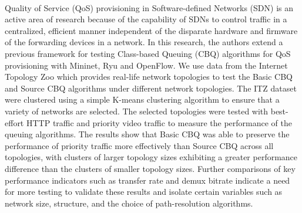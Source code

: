 \begin{thesisabstract}
\paragraph{         } Quality of Service (QoS) provisioning in Software-defined Networks (SDN) is an active area of research because of the capability of SDNs to control traffic in a centralized, efficient manner independent of the disparate hardware and firmware of the forwarding devices in a network. In this research, the authors extend a previous framework for testing Class-based Queuing (CBQ) algorithms for QoS provisioning with Mininet, Ryu and OpenFlow. We use data from the Internet Topology Zoo which provides real-life network topologies to test the Basic CBQ and Source CBQ algorithms under different network topologies. The ITZ dataset were clustered using a simple K-means clustering algorithm to ensure that a variety of networks are selected. The selected topologies were tested with best-effort HTTP traffic and priority video traffic to measure the performance of the queuing algorithms. The results show that Basic CBQ was able to preserve the performance of priority traffic more effectively than Source CBQ across all topologies, with clusters of larger topology sizes exhibiting a greater performance difference than the clusters of smaller topology sizes. Further comparisons of key performance indicators such as transfer rate and demux bitrate indicate a need for more testing to validate these results and isolate certain variables such as network size, structure, and the choice of path-resolution algorithms.
\end{thesisabstract}
